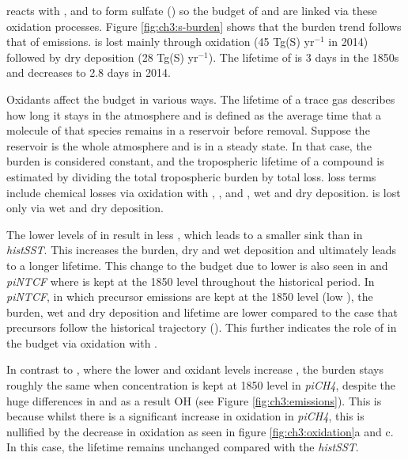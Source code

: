  reacts with ,  and  to form sulfate () so the budget of  and  are linked via these oxidation processes. Figure \ref{fig:ch3:s-burden} shows that the  burden trend follows that of  emissions.  is lost mainly through oxidation (45 Tg(S) yr$^{-1}$ in 2014) followed by dry deposition (28 Tg(S) yr$^{-1}$). The lifetime of  is 3 days in the 1850s and decreases to 2.8 days in 2014. 

Oxidants affect the  budget in various ways. The lifetime of a trace gas describes how long it stays in the atmosphere and is defined as the average time that a molecule of that species remains in a reservoir before removal. Suppose the reservoir is the whole atmosphere and is in a steady state. In that case, the burden is considered constant, and the tropospheric lifetime of a compound is estimated by dividing the total tropospheric burden by total loss.  loss terms include chemical losses via oxidation with , , and , wet and dry deposition.  is lost only via wet and dry deposition.

The lower levels of  in \sstpio{} result in less , which leads to a smaller  sink than in \textit{histSST}. This increases the  burden, dry and wet deposition and ultimately leads to a longer lifetime. This change to the  budget due to lower  is also seen in \sstpiaer{} and \textit{piNTCF} where  is kept at the 1850 level throughout the historical period. In \textit{piNTCF}, in which  precursor emissions are kept at the 1850 level (low ), the  burden, wet and dry deposition and lifetime are lower compared to the case that  precursors follow the historical trajectory (\sstpiaer{}). This further indicates the role of  in the  budget via oxidation with .


In contrast to \sstpio{}, where the lower  and oxidant levels increase , the  burden stays roughly the same when  concentration is kept at 1850 level in \textit{piCH4}, despite the huge differences in  and as a result OH (see Figure \ref{fig:ch3:emissions}). This is because whilst there is a significant increase in  oxidation in \textit{piCH4}, this is nullified by the decrease in  oxidation as seen in figure \ref{fig:ch3:oxidation}a and c. In this case, the  lifetime remains unchanged compared with the \textit{histSST}.

